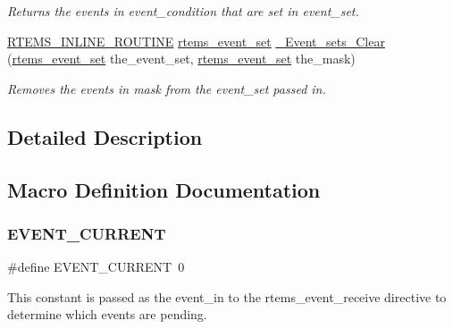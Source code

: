 \begin{DoxyCompactItemize}
\begin{DoxyCompactList}\small\item\em Returns the events in event\+\_\+condition that are set in event\+\_\+set. \end{DoxyCompactList}\item 
\mbox{\hyperlink{group__RTEMSScoreBaseDefs_gac216239df231d5dbd15e3520b0b9313f}{R\+T\+E\+M\+S\+\_\+\+I\+N\+L\+I\+N\+E\+\_\+\+R\+O\+U\+T\+I\+NE}} \mbox{\hyperlink{group__ClassicEventSet_gab7b8f373bea85fd4e3b7ae23905faa07}{rtems\+\_\+event\+\_\+set}} \mbox{\hyperlink{group__ClassicEventImpl_gad53c0942eed159db62df6179f73417f3}{\+\_\+\+Event\+\_\+sets\+\_\+\+Clear}} (\mbox{\hyperlink{group__ClassicEventSet_gab7b8f373bea85fd4e3b7ae23905faa07}{rtems\+\_\+event\+\_\+set}} the\+\_\+event\+\_\+set, \mbox{\hyperlink{group__ClassicEventSet_gab7b8f373bea85fd4e3b7ae23905faa07}{rtems\+\_\+event\+\_\+set}} the\+\_\+mask)
\begin{DoxyCompactList}\small\item\em Removes the events in mask from the event\+\_\+set passed in. \end{DoxyCompactList}\end{DoxyCompactItemize}


\subsection{Detailed Description}


\subsection{Macro Definition Documentation}
\mbox{\label{group__ClassicEventImpl_ga389f92d1a5ea7eb4e9bb7ddb3464700e}} 
\subsubsection{\texorpdfstring{EVENT\_CURRENT}{EVENT\_CURRENT}}
{\footnotesize\ttfamily \#define E\+V\+E\+N\+T\+\_\+\+C\+U\+R\+R\+E\+NT~0}

This constant is passed as the event\+\_\+in to the rtems\+\_\+event\+\_\+receive directive to determine which events are pending. \mbox{\label{group__ClassicEventImpl_ga07a7e358ae0de9212f4cd588e4762983}} 
